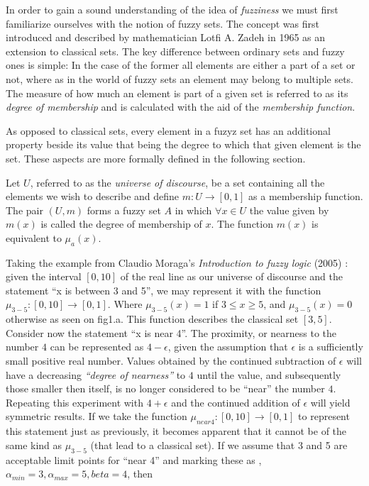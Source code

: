 
In order to gain a sound understanding of the idea of \textit{fuzziness} we must first familiarize ourselves with the notion of fuzzy sets. The concept was first introduced and described by mathematician Lotfi A. Zadeh in 1965 as an extension to classical sets. The key difference between ordinary sets and fuzzy ones is simple: In the case of the former all elements are either a part of a set or not, where as in the world of fuzzy sets an element may belong to multiple sets. The measure of how much an element is part of a given set is referred to as its \textit{degree of membership} and is calculated with the aid of the \textit{membership function}.

As opposed to classical sets, every element in a fuzyz set has an additional property beside its value that being the degree to which that given element is the set. These aspects are more formally defined in the following section.

\begin{definition}
Let $U$, referred to as the \textit{universe of discourse}, be a set containing all the elements we wish to describe and define $m:U \to [0, 1]$ as a membership function. The pair $(U, m) $ forms a fuzzy set $A$ in which $\forall x \in U$ the value given by $m(x)$ is called the degree of membership of $x$. The function $m(x)$ is equivalent to $\mu_{a}(x)$.
\end{definition}

Taking the example from Claudio Moraga's \textit{Introduction to fuzzy logic} (2005) \cite{moraga2005intro}: given the interval $[0, 10]$ of the real line as our universe of discourse and the statement ``x is between 3 and 5'', we may represent it with the function $\mu_{3-5}:[0, 10] \to [0,1]$. Where $\mu_{3-5}(x) = 1$ if $3 \leq x \geq 5$, and $\mu_{3-5}(x) = 0$ otherwise as seen on fig1.a. This function describes the classical set $[3, 5]$. Consider now the statement ``x is near 4''. The proximity, or nearness to the number $4$ can be represented as $4-\epsilon$, given the assumption that $\epsilon$ is a sufficiently small positive real number. Values obtained by the continued subtraction of $\epsilon$ will have a decreasing \textit{``degree of nearness''} to $4$ until the value, and subsequently those smaller then itself, is no longer considered to be ``near'' the number $4$. Repeating this experiment with $4+\epsilon$ and the continued addition of $\epsilon$ will yield symmetric results. If we take the function $\mu_{near 4} : [0, 10] \to [0, 1]$ to represent this statement just as previously, it becomes apparent that it cannot be of the same kind as $\mu_{3-5}$ (that lead to a classical set). If we assume that 3 and 5 are acceptable limit points for ``near 4” and marking these as , $\alpha_{min} = 3, \alpha_{max} = 5, beta = 4$, then

